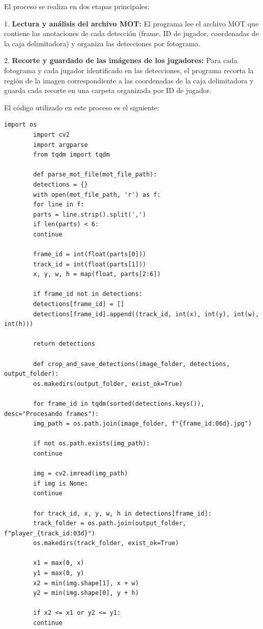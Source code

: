\documentclass[12pt, a4paper, twoside]{article}
\begin{document}
	El proceso se realiza en dos etapas principales:
	
	1. \textbf{Lectura y análisis del archivo MOT:} El programa lee el archivo MOT que contiene las anotaciones de cada detección (frame, ID de jugador, coordenadas de la caja delimitadora) y organiza las detecciones por fotograma.
	
	2. \textbf{Recorte y guardado de las imágenes de los jugadores:} Para cada fotograma y cada jugador identificado en las detecciones, el programa recorta la región de la imagen correspondiente a las coordenadas de la caja delimitadora y guarda cada recorte en una carpeta organizada por ID de jugador.
	
	El código utilizado en este proceso es el siguiente:
	\vspace{0.5cm}
	
	\begin{lstlisting}[style=pythonstyle]
		import os 
		import cv2
		import argparse
		from tqdm import tqdm
		
		def parse_mot_file(mot_file_path):
		detections = {}
		with open(mot_file_path, 'r') as f:
		for line in f:
		parts = line.strip().split(',')
		if len(parts) < 6:
		continue
		
		frame_id = int(float(parts[0]))
		track_id = int(float(parts[1]))
		x, y, w, h = map(float, parts[2:6])
		
		if frame_id not in detections:
		detections[frame_id] = []
		detections[frame_id].append((track_id, int(x), int(y), int(w), int(h)))
		
		return detections
		
		def crop_and_save_detections(image_folder, detections, output_folder):
		os.makedirs(output_folder, exist_ok=True)
		
		for frame_id in tqdm(sorted(detections.keys()), desc="Procesando frames"):
		img_path = os.path.join(image_folder, f"{frame_id:06d}.jpg")
		
		if not os.path.exists(img_path):
		continue
		
		img = cv2.imread(img_path)
		if img is None:
		continue
		
		for track_id, x, y, w, h in detections[frame_id]:
		track_folder = os.path.join(output_folder, f"player_{track_id:03d}")
		os.makedirs(track_folder, exist_ok=True)
		
		x1 = max(0, x)
		y1 = max(0, y)
		x2 = min(img.shape[1], x + w)
		y2 = min(img.shape[0], y + h)
		
		if x2 <= x1 or y2 <= y1:
		continue
		

\end{lstlisting}
\end{document}
